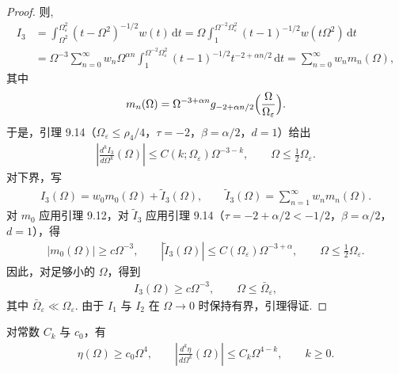 \begin{proof}
则,
\begin{align*}
  I_{3}
  &=\int_{\Omega^{2}}^{\Omega_{\varepsilon}^{2}}(t-\Omega^{2})^{-1/2}w(t)\,\mathrm{d}t
  =\Omega\int_{1}^{\Omega^{-2}\Omega_{\varepsilon}^{2}}(t-1)^{-1/2}w(t\Omega^{2})\,\mathrm{d}t\\
  &=\Omega^{-3}\sum_{n=0}^{\infty}w_{n}\Omega^{\alpha n}
   \int_{1}^{\Omega^{-2}\Omega_{\varepsilon}^{2}}(t-1)^{-1/2}t^{-2+\alpha n/2}\,\mathrm{d}t
  =\sum_{n=0}^{\infty}w_{n}m_{n}(\Omega),
\end{align*}
其中
\begin{align*}
  m_{n}(\Omega)=\Omega^{-3+\alpha n}g_{-2+\alpha n/2}\Bigl(\frac{\Omega}{\Omega_{\varepsilon}}\Bigr).
\end{align*}
于是，引理 9.14（$\Omega_\varepsilon \leq \rho_4/4$，$\tau = -2$，$\beta = \alpha/2$，$d = 1$）给出
\begin{align*}
  \left|\frac{d^{k}I_{3}}{d\Omega^{k}}(\Omega)\right|\leq C(k;\Omega_{\varepsilon})\Omega^{-3-k},\qquad \Omega\leq\frac{1}{2}\Omega_{\varepsilon}.
\end{align*}
对下界，写
\begin{align*}
  I_{3}(\Omega)=w_{0}m_{0}(\Omega)+\tilde{I}_{3}(\Omega),\qquad
  \tilde{I}_{3}(\Omega)=\sum_{n=1}^{\infty}w_{n}m_{n}(\Omega).
\end{align*}
对 $m_0$ 应用引理 9.12，对 $\tilde{I}_3$ 应用引理 9.14（$\tau = -2 + \alpha/2 < -1/2$，$\beta = \alpha/2$，$d = 1$），得
\begin{align*}
  |m_{0}(\Omega)|\geq c\Omega^{-3},\qquad
  |\tilde{I}_{3}(\Omega)|\leq C(\Omega_{\varepsilon})\Omega^{-3+\alpha},\qquad
  \Omega\leq\frac{1}{2}\Omega_{\varepsilon}.
\end{align*}
因此，对足够小的 $\Omega$，得到
\begin{align*}
  I_{3}(\Omega)\geq c\Omega^{-3},\qquad \Omega\leq\bar{\Omega}_{\varepsilon},
\end{align*}
其中 $\bar{\Omega}_\varepsilon \ll \Omega_\varepsilon$. 由于 $I_1$ 与 $I_2$ 在 $\Omega \to 0$ 时保持有界，引理得证.
\end{proof}

\begin{corollary}\label{cor:9.18}
对常数 $C_{k}$ 与 $c_{0}$，有
\begin{align*}
  \eta(\Omega)\geq c_{0}\Omega^{4},\qquad
  \left|\frac{d^{k}\eta}{d\Omega^{k}}(\Omega)\right|\leq C_{k}\Omega^{4-k},\qquad k\geq 0.
\end{align*}
\end{corollary}


